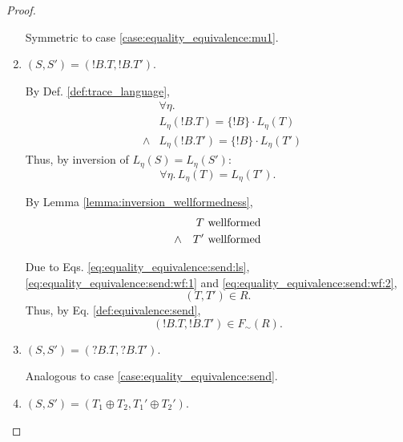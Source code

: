 \documentclass{llncs}
\newcommand*{\sequiv}{\sim}
\newcommand*{\send}{\mathord{!}}
\newcommand*{\recv}{\mathord{?}}
\newcommand*{\echoice}{\oplus}
\newcommand*{\concat}{\cdot}
\newcommand*{\wf}[1]{\text{$#1$ {\normalfont \rmfamily wellformed}}}
\renewcommand*{\|}{\;|\;}
\begin{document}
\begin{proof}
\begin{enumerate}
      Symmetric to case \ref{case:equality_equivalence:mu1}.

    \item
      \label{case:equality_equivalence:send}
      $(S, S') = (\send B.T, \send B.T')$.

      By Def. \ref{def:trace_language},
      \begin{eqnarray*}
        &&      \forall \eta. \\
        &&      L_\eta(\send B.T)  = \{\send B\} \concat L_\eta(T) \\
        &\land& L_\eta(\send B.T') = \{\send B\} \concat L_\eta(T')
      \end{eqnarray*}
      Thus, by inversion of $L_\eta(S) = L_\eta(S')$:
      \begin{equation}
        \label{eq:equality_equivalence:send:ls}
        \forall \eta.\, L_\eta(T) = L_\eta(T').
      \end{equation}

      By Lemma \ref{lemma:inversion_wellformedness},
      \begin{eqnarray}
        \label{eq:equality_equivalence:send:wf:1} &&      \wf{T} \\
        \label{eq:equality_equivalence:send:wf:2} &\land& \wf{T'}
      \end{eqnarray}

      Due to Eqs. \ref{eq:equality_equivalence:send:ls},
      \ref{eq:equality_equivalence:send:wf:1} and
      \ref{eq:equality_equivalence:send:wf:2},
      \begin{equation*}
        (T, T') \in R.
      \end{equation*}
      Thus, by Eq. \ref{def:equivalence:send},
      \begin{equation*}
        (\send B.T, \send B.T') \in F_\sequiv(R).
      \end{equation*}

    \item
      \label{case:equality_equivalence:recv}
      $(S, S') = (\recv B.T, \recv B.T')$.

      Analogous to case \ref{case:equality_equivalence:send}.

    \item
      \label{case:equality_equivalence:echoice}
      $(S, S') = (T_1 \echoice T_2, T_1' \echoice T_2')$.


\end{enumerate}
\end{proof}
\end{document}
